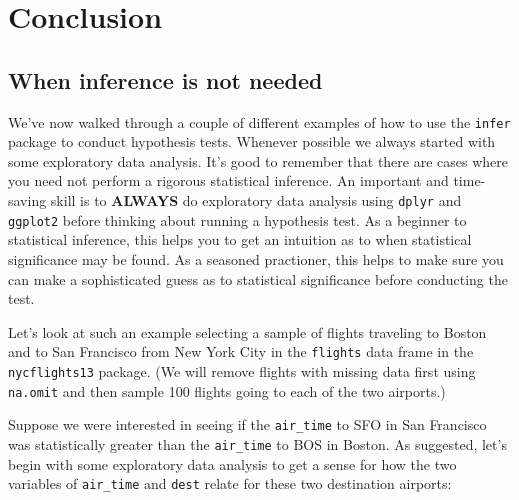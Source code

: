 \documentclass[12pt, krantz2,]{krantz}
\makeatletter
\newenvironment{Shaded}{\begin{snugshade}}{\end{snugshade}}
\newcommand{\DecValTok}[1]{\textcolor[rgb]{0.06,0.06,0.06}{#1}}
\newcommand{\KeywordTok}[1]{\textcolor[rgb]{0.27,0.27,0.27}{\textbf{#1}}}
\newcommand{\NormalTok}[1]{#1}
\newcommand{\OperatorTok}[1]{\textcolor[rgb]{0.43,0.43,0.43}{\textbf{#1}}}
\newcommand{\StringTok}[1]{\textcolor[rgb]{0.5,0.5,0.5}{#1}}
\newenvironment{kframe}{%
\medskip{}
\setlength{\fboxsep}{.8em}
 \def\at@end@of@kframe{}%
 \ifinner\ifhmode%
  \def\at@end@of@kframe{\end{minipage}}%
  \begin{minipage}{\columnwidth}%
 \fi\fi%
 \def\FrameCommand##1{\hskip\@totalleftmargin \hskip-\fboxsep
 \colorbox{shadecolor}{##1}\hskip-\fboxsep
     \hskip-\linewidth \hskip-\@totalleftmargin \hskip\columnwidth}%
 \MakeFramed {\advance\hsize-\width
   \@totalleftmargin\z@ \linewidth\hsize
   \@setminipage}}%
 {\par\unskip\endMakeFramed%
 \at@end@of@kframe}
\renewenvironment{Shaded}{\begin{kframe}}{\end{kframe}}
\makeatother
\begin{document}
\hypertarget{conclusion-6}{%
\section{Conclusion}\label{conclusion-6}}

\hypertarget{when-inference-is-not-needed}{%
\subsection{When inference is not needed}\label{when-inference-is-not-needed}}

We've now walked through a couple of different examples of how to use the \texttt{infer} package to conduct hypothesis tests. Whenever possible we always started with some exploratory data analysis. It's good to remember that there are cases where you need not perform a rigorous statistical inference. An important and time-saving skill is to \textbf{ALWAYS} do exploratory data analysis using \texttt{dplyr} and \texttt{ggplot2} before thinking about running a hypothesis test. As a beginner to statistical inference, this helps you to get an intuition as to when statistical significance may be found. As a seasoned practioner, this helps to make sure you can make a sophisticated guess as to statistical significance before conducting the test.

Let's look at such an example selecting a sample of flights traveling to Boston and to San Francisco from New York City in the \texttt{flights} data frame in the \texttt{nycflights13} package. (We will remove flights with missing data first using \texttt{na.omit} and then sample 100 flights going to each of the two airports.)

\begin{Shaded}
\end{Shaded}

Suppose we were interested in seeing if the \texttt{air\_time} to SFO in San Francisco was statistically greater than the \texttt{air\_time} to BOS in Boston. As suggested, let's begin with some exploratory data analysis to get a sense for how the two variables of \texttt{air\_time} and \texttt{dest} relate for these two destination airports:
\end{document}
